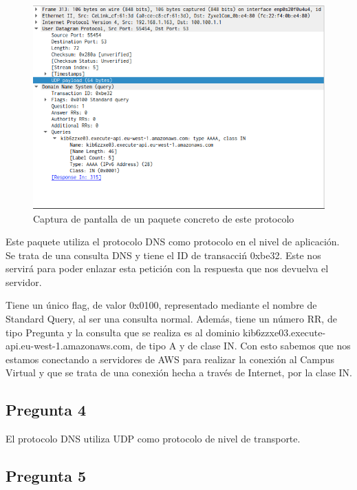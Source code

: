 \documentclass[spanish]{report} %
\begin{document}
\begin{figure}[h]
\begin{center}
\includegraphics[scale=.5]{../img/13.png}
\end{center}
\caption{Captura de pantalla de un paquete concreto de este protocolo}
\end{figure}

Este paquete utiliza el protocolo DNS como protocolo en el nivel de aplicación.
Se trata de una consulta DNS y tiene el ID de transacciń 0xbe32. Este nos
servirá para poder enlazar esta petición con la respuesta que nos devuelva el
servidor.\newline

Tiene un único flag, de valor 0x0100, representado mediante el nombre de
Standard Query, al ser una consulta normal. Además, tiene un número RR, de tipo
Pregunta y la consulta que se realiza es al dominio
kib6zzxe03.execute-api.eu-west-1.amazonaws.com, de tipo A y de clase IN. Con
esto sabemos que nos estamos conectando a servidores de AWS para realizar la
conexión al Campus Virtual y que se trata de una conexión hecha a través de
Internet, por la clase IN.

\subsection{Pregunta 4}

El protocolo DNS utiliza UDP como protocolo de nivel de transporte.
\newpage

\subsection{Pregunta 5}
\end{document}
